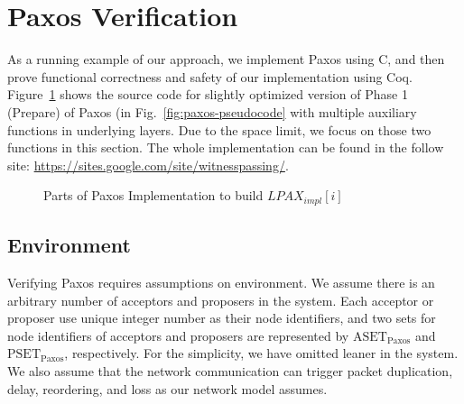 
\section{Paxos Verification}
\label{sec:paxos-verification}

As a running example of our approach, 
we implement Paxos using C, 
and then prove functional correctness and safety of our implementation using Coq.
Figure~\ref{fig:paxos-proposer-example} shows the source code for slightly 
optimized version of 
Phase 1 (Prepare) of Paxos  (in  Fig.~\ref{fig:paxos-pseudocode}
with  multiple auxiliary functions in underlying layers. 
Due to the space limit, we focus on those two functions in this section.
The whole implementation can be found in the follow site: \url{https://sites.google.com/site/witnesspassing/}.


\begin{figure}
\begin{minipage}{\linewidth}
\noindent
\begin{multicols}{2}

\end{multicols}
\end{minipage}
\caption{Parts of Paxos Implementation to build  $LPAX_{impl}[i]$}
\label{fig:paxos-proposer-example}
\end{figure}

\newcommand{\paxset}{\mathrm{SET}_{\mathrm{Paxos}}}
\newcommand{\paxpropset}{\mathrm{PSET}_{\mathrm{Paxos}}}
\newcommand{\paxaccset}{\mathrm{ASET}_{\mathrm{Paxos}}}

\subsection{Environment}
\label{subsec:environment}

Verifying Paxos requires assumptions on environment.
We assume there is an arbitrary number of acceptors and proposers in the system.
Each acceptor or proposer use unique integer number as their node identifiers, and two sets for node identifiers of acceptors and proposers
are represented by $\paxaccset$ and $\paxpropset$, respectively. 
For the simplicity,  we have omitted leaner in the system.
We also assume that the network communication can trigger packet duplication, delay, reordering, and loss as our network model assumes. 

